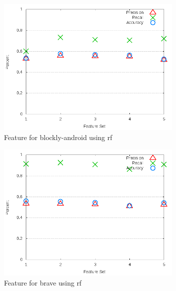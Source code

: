 \begin{figure}[!t]
\centering
\includegraphics[width=0.8\textwidth]{images/rf/test_3/blockly-android_sample_range.png}
\caption{Feature for blockly-android using \gls{rf}}
\label{fig:test_3_blockly-android_rf}
\end{figure}

\begin{figure}[!t]
\centering
\includegraphics[width=0.8\textwidth]{images/rf/test_3/brave_sample_range.png}
\caption{Feature for brave using \gls{rf}}
\label{fig:test_3_brave_rf}
\end{figure}

